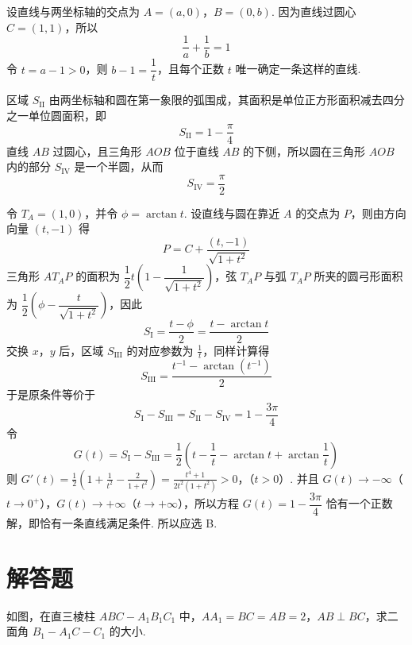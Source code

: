 \begin{solution}
设直线与两坐标轴的交点为 \(A=(a,0)\)，\(B=(0,b)\). 因为直线过圆心 \(C=(1,1)\)，所以
\[
\frac1a+\frac1b=1
\]
令 \(t=a-1>0\)，则 \(b-1=\dfrac1t\)，且每个正数 \(t\) 唯一确定一条这样的直线.

区域 \(S_{\mathrm{II}}\) 由两坐标轴和圆在第一象限的弧围成，其面积是单位正方形面积减去四分之一单位圆面积，即
\[
S_{\mathrm{II}}=1-\frac\pi4
\]
直线 \(AB\) 过圆心，且三角形 \(AOB\) 位于直线 \(AB\) 的下侧，所以圆在三角形 \(AOB\) 内的部分 \(S_{\mathrm{IV}}\) 是一个半圆，从而
\[
S_{\mathrm{IV}}=\frac\pi2
\]

令 \(T_A=(1,0)\)，并令 \(\phi=\arctan t\). 设直线与圆在靠近 \(A\) 的交点为 \(P\)，则由方向向量 \((t,-1)\) 得
\[
P=C+\frac{(t,-1)}{\sqrt{1+t^2}}
\]
三角形 \(AT_AP\) 的面积为 \(\dfrac12t\left(1-\dfrac1{\sqrt{1+t^2}}\right)\)，弦 \(T_AP\) 与弧 \(T_AP\) 所夹的圆弓形面积为 \(\dfrac12\left(\phi-\dfrac{t}{\sqrt{1+t^2}}\right)\)，因此
\[
S_{\mathrm I}=\frac{t-\phi}{2}=\frac{t-\arctan t}{2}
\]
交换 \(x\)，\(y\) 后，区域 \(S_{\mathrm{III}}\) 的对应参数为 \(\frac{1}{t}\)，同样计算得
\[
S_{\mathrm{III}}=\frac{t^{-1}-\arctan(t^{-1})}{2}
\]
于是原条件等价于
\[
S_{\mathrm I}-S_{\mathrm{III}}=S_{\mathrm{II}}-S_{\mathrm{IV}}=1-\frac{3\pi}{4}
\]
令
\[
G(t)=S_{\mathrm I}-S_{\mathrm{III}}=\frac12\left(t-\frac1t-\arctan t+\arctan\frac1t\right)
\]
则
\(G'(t)=\frac12\left(1+\frac1{t^2}-\frac2{1+t^2}\right)=\frac{t^4+1}{2t^2(1+t^2)}>0\)，（\(t>0\)）.
并且 \(G(t)\to-\infty\)（\(t\to0^+\)），\(G(t)\to+\infty\)（\(t\to+\infty\)），所以方程 \(G(t)=1-\dfrac{3\pi}{4}\) 恰有一个正数解，即恰有一条直线满足条件. 所以应选 B.
\end{solution}

\section{解答题}

\begin{problem}
如图，在直三棱柱 \(ABC - A_1B_1C_1\) 中，\(AA_1 = BC = AB = 2\)，\(AB \perp BC\)，求二面角 \(B_1 - A_1C - C_1\) 的大小.

\end{problem}

